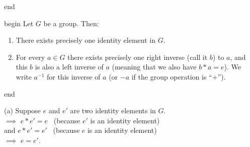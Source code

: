 \documentclass[
  12pt,
  a4paper,
  twoside]{article}
\theoremstyle{plain}
\theoremstyle{definition}
\begin{document}
\csname end

\csname begin\label{cnj:prop-groups-enhancing-axioms}
Let \(G\) be a group. Then:

\begin{enumerate}
\def\labelenumi{(\alph{enumi})}
\item
  There exists precisely one identity element in \(G\).
\item
  For every \(a\in G\) there exists precisely one right inverse (call it \(b\)) to \(a\), and this \(b\) is also a left inverse of \(a\) (meaning that we also have \(b*a=e\)). We write \(a^{-1}\) for this inverse of \(a\) (or \(-a\) if the group operation is ``\(+\)'').
\end{enumerate}

\csname end

\(\)(a) Suppose \(e\) and \(e'\) are two identity elements in \(G\).\\
\(\implies\) \(e*e' = e\) \hfill~{(because \(e'\) is an identity element)}\\
\hspace*{0.333em}\hspace*{0.333em}\hspace*{0.333em}and \(e*e' = e'\) \hfill~{(because \(e\) is an identity element)}\\
\(\implies\) \(e=e'\).
\end{document}
